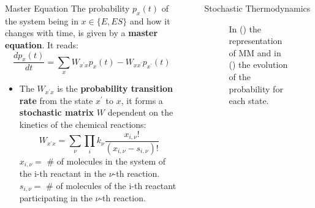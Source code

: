 \documentclass[final]{beamer}
\newlength{\sepwidth}
\newlength{\colwidth}
\newcommand{\separatorcolumn}{\begin{column}{\sepwidth}\end{column}}
\begin{document}
\begin{frame}[t]
\begin{columns}[t]
\begin{column}{\colwidth}
\begin{block}{Master Equation}
The probability $p_x(t)$ of the system being in $x \in \{E,ES\}$ and how it changes with time, is given by a {\bf master equation}\cite{van2007stochastic}. It reads:
%
\begin{equation}
\frac{dp_x(t)}{dt} = \sum_x W_{x^\prime x} p_x(t) -  W_{x x^\prime}p_{x^\prime}(t) \label{eq CME}
\end{equation}
\begin{itemize}
\item The $W_{x^\prime x}$ is the {\bf probability transition rate} from the state $x^\prime$ to $x$, it forms a {\bf stochastic matrix} $W$ dependent on the kinetics of the chemical reactions\cite{GILLESPIE1976403}:
\begin{equation}
W_{x^\prime x} = \sum_\nu \prod_i k_\nu \frac{x_{i,\nu}!}{(x_{i,\nu} - s_{i,\nu})!}
\end{equation}
$x_{i,\nu} = $ \# of molecules in the system of the i-th reactant in the $\nu$-th reaction.\\
$s_{i,\nu} = $ \# of molecules of the i-th reactant participating in the $\nu$-th reaction.
\end{itemize}
\end{block}

\end{column}

\separatorcolumn

\begin{column}{\colwidth}

\begin{block}{Stochastic Thermodynamics}
\vskip10pt
\begin{figure}
\label{fig 1}
\begin{subfigure}[b]{0.45\textwidth}
\centering

\caption{}
\label{fig 2-state-system}
\end{subfigure}
\begin{subfigure}[b]{0.45\textwidth}
\centering

\caption{}
\label{fig 2-prob-evol}
\end{subfigure}
\caption{In () the representation of MM\cite{esposito2023} and in () the evolution of the probability for each state.}
\end{figure}



\end{block}
\end{column}
\end{columns}
\end{frame}
\end{document}
